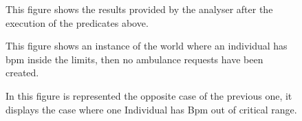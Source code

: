     \begin{figure}[H]
        \centering
        \caption{This figure shows the results provided by the analyser after the execution of the predicates above.}
        \label{ fig:ASOS-Results }
    \end{figure}
    
    \begin{figure}[H]
        \centering
        \caption{This figure shows an instance of the world where an individual has bpm inside the limits, then no ambulance requests have been created. }
        \label{ fig:ASOS-model-bpm-ok }
    \end{figure}
    
    \begin{figure}[H]
        \centering
        \caption{ In this figure is represented the opposite case of the previous one, it displays the case where one Individual has Bpm out of critical range. }
        \label{ fig:ASOS-model-request }
    \end{figure}

